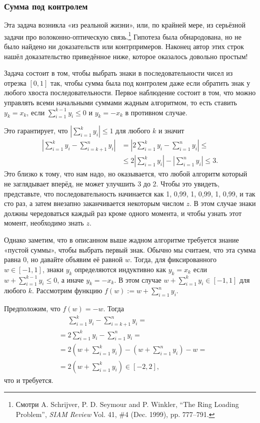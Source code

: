 \subsubsection*{Сумма под контролем}

Эта задача возникла «из реальной жизни», или, по крайней мере, из серьёзной задачи про волоконно-оптическую связь.\footnote{Смотри A. Schrijver, P. D. Seymour and P. Winkler, ``The Ring Loading Problem'', \emph{SIAM Review} Vol. 41, \#4 (Dec. 1999), pp. 777--791.}
Гипотеза была обнародована, но не было найдено ни доказательств или контрпримеров.
Наконец автор этих строк нашёл доказательство приведённое ниже, которое оказалось довольно простым!

Задача состоит в том, чтобы выбрать знаки в последовательности чисел из отрезка $[0,1]$ так, чтобы сумма была под контролем даже если обратить знак у любого хвоста последовательности.
Первое наблюдение состоит в том, что можно управлять всеми начальными суммами жадным алгоритмом, то есть ставить $y_k=x_k$, если $\sum_{i=1}^{k-1}y_i \le 0$ и $y_k=-x_k$ в противном случае.

Это гарантирует, что $\left|\sum_{i=1}^{k}y_i\right| \le 1$ для любого $k$ и значит
\begin{align*}
\left|\sum_{i=1}^{k}y_i-\sum_{i=k+1}^{n}y_i\right|&=\left|2\sum_{i=1}^{k}y_i-\sum_{i=1}^{n}y_i\right|\le
\\
&\le2\left|\sum_{i=1}^{k}y_i\right|-\left|\sum_{i=1}^{n}y_i\right|\le3.
\end{align*}
Это близко к тому, что нам надо, но оказывается, что любой алгоритм который не заглядывает вперёд, не может улучшить 3 до 2.
Чтобы это увидеть, представьте, что последовательность начинается как
1, 0,99, 1, 0,99, 1, 0,99, и так сто раз, а затем внезапно заканчивается некоторым числом $z$.
В этом случае знаки должны чередоваться каждый раз кроме одного момента, и чтобы узнать этот момент, необходимо знать $z$.

Однако заметим, что в описанном выше жадном алгоритме требуется знание «пустой суммы», чтобы выбрать первый знак.
Обычно мы считаем, что эта сумма равна 0, но давайте объявим её равной $w$.
Тогда, для фиксированного $w\in [-1,1]$, знаки $y_k$ определяются индуктивно как $y_k=x_k$ если $w+\sum_{i=1}^{k-1}y_i \le 0$, а иначе $y_k=-x_k$.
В этом случае $w+\sum_{i=1}^{k}y_i \in[-1,1]$ для любого $k$.
Рассмотрим функцию $f(w) \mathop{{:}{=}} w+\sum_{i=1}^ny_i$. %

Предположим, что $f(w)=-w$.
Тогда
\begin{align*}
&\phantom{=}\sum_{i=1}^{k}y_i-\sum_{i=k+1}^{n}y_i=
\\
&=2\sum_{i=1}^{k}y_i-\sum_{i=1}^{n}y_i=
\\
&=2\left(w+\sum_{i=1}^{k}y_i\right)-\left(w+\sum_{i=1}^{n}y_i\right)-w=
\\
&=2\left(w+\sum_{i=1}^{k}y_i\right)\in[-2,2],
\end{align*}
что и требуется.


